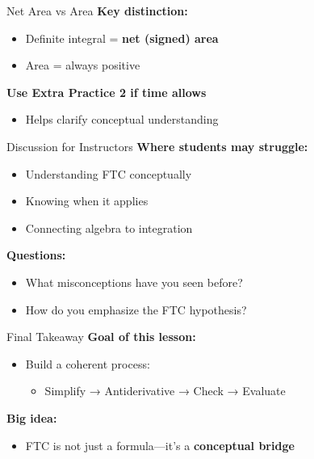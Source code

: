 \documentclass[dvipsnames]{beamer}
\begin{document}

\begin{frame}{Net Area vs Area}
\textbf{Key distinction:}
\begin{itemize}
\item Definite integral = \textbf{net (signed) area}
\item Area = always positive
\end{itemize}

\vspace{1em}

\textbf{Use Extra Practice 2 if time allows}
\begin{itemize}
\item Helps clarify conceptual understanding
\end{itemize}
\end{frame}


\begin{frame}{Discussion for Instructors}
\textbf{Where students may struggle:}
\begin{itemize}
\item Understanding FTC conceptually
\item Knowing when it applies
\item Connecting algebra to integration
\end{itemize}

\vspace{1em}

\textbf{Questions:}
\begin{itemize}
\item What misconceptions have you seen before?
\item How do you emphasize the FTC hypothesis?
\end{itemize}
\end{frame}




\begin{frame}{Final Takeaway}
\textbf{Goal of this lesson:}
\begin{itemize}
\item Build a coherent process:
\begin{itemize}
\item Simplify → Antiderivative → Check → Evaluate
\end{itemize}
\end{itemize}

\vspace{1em}

\textbf{Big idea:}
\begin{itemize}
\item FTC is not just a formula—it’s a \textbf{conceptual bridge}
\end{itemize}
\end{frame}
\end{document}

